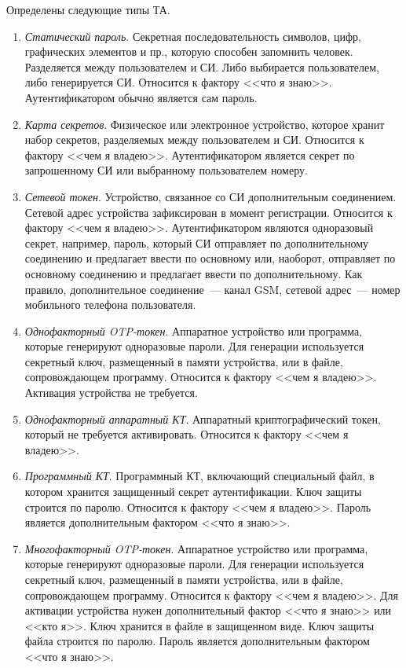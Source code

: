 Определены следующие типы ТА.

\begin{enumerate}
\item
{\it Статический пароль}.
Секретная последовательность символов, цифр, графических элементов и пр., 
которую способен запомнить человек. 
Разделяется между пользователем и СИ.
Либо выбирается пользователем, либо генерируется СИ.
Относится к фактору <<что я знаю>>. 
Аутентификатором обычно является сам пароль.

\item
{\it Карта секретов}.
Физическое или электронное устройство, которое хранит набор секретов,
разделяемых между пользователем и СИ. Относится к фактору <<чем я владею>>. 
Аутентификатором является секрет по запрошенному СИ или выбранному 
пользователем номеру.

\item
{\it Сетевой токен}.
Устройство, связанное со СИ дополнительным соединением.
Сетевой адрес устройства зафиксирован в момент регистрации.
Относится к фактору <<чем я владею>>. 
%
Аутентификатором являются одноразовый секрет, например, пароль, который СИ
отправляет по дополнительному соединению и предлагает ввести по основному или,
наоборот, отправляет по основному соединению и предлагает ввести по
дополнительному.
%
Как правило, дополнительное соединение~--- канал GSM, сетевой адрес~--- номер
мобильного телефона пользователя.

\item
{\it Однофакторный OTP-токен}.
Аппаратное устройство или программа, которые генерируют одноразовые пароли. Для
генерации используется секретный ключ, размещенный в памяти устройства, или в
файле, сопровождающем программу. Относится к фактору <<чем я владею>>. Активация
устройства не требуется.
%

\item
{\it Однофакторный аппаратный КТ}.
Аппаратный криптографический токен, который не требуется активировать.
Относится к фактору <<чем я владею>>. 

\item
{\it Программный КТ}.
Программный КТ, включающий специальный файл, в котором хранится защищенный 
секрет аутентификации. Ключ защиты строится по паролю.
%
Относится к фактору <<чем я владею>>. 
Пароль является дополнительным фактором <<что я знаю>>.

\item
{\it Многофакторный OTP-токен}.
Аппаратное устройство или программа, которые генерируют одноразовые пароли. 
Для генерации используется секретный ключ, размещенный в памяти устройства,
или в файле, сопровождающем программу. 
%
Относится к фактору <<чем я владею>>. 
%
Для активации устройства нужен дополнительный фактор <<что я знаю>> или 
<<кто я>>. 
%
Ключ хранится в файле в защищенном виде. Ключ защиты файла строится по паролю.
Пароль является дополнительным фактором <<что я знаю>>.


\end{enumerate}
